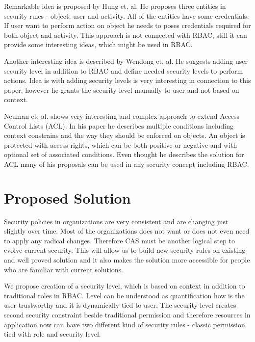 \documentclass{sig-alternate}
\begin{document}
Remarkable idea is proposed by Hung et. al. \cite{hung} He proposes three entities in security rules - object, user and activity. All of the entities have some credentials. If user want to perform action on object he needs to poses credentials required for both object and activity. This approach is not connected with RBAC, still it can provide some interesting ideas, which might be used in RBAC.

Another interesting idea is described by Wendong et. al. \cite{wendong} He suggests adding user security level in addition to RBAC and define needed security levels to perform actions. Idea is with adding security levels is very interesting in connection to this paper, however he grants the security level manually to user and not based on context.

Neuman et. al. \cite{eacl} shows very interesting and complex approach to extend Access Control Lists (ACL). In his paper he describes multiple conditions including context constrains and the way they should be enforced on objects. An object is protected with access rights, which can be both positive or negative and with optional set of associated conditions. Even thought he describes the solution for ACL many of his proposals can be used in any security concept including RBAC.

\section{Proposed Solution}
Security policies in organizations are very consistent and are changing just slightly over time. Most of the organizations does not want or does not even need to apply any radical changes. Therefore CAS must be another logical step to evolve current security. This will allow us to build new security rules on existing and well proved solution and it also makes the solution more accessible for people who are familiar with current solutions.

We propose creation of a security level, which is based on context in addition to traditional roles in RBAC. Level can be understood as quantification how is the user trustworthy and it is dynamically tied to user. The security level creates second security constraint beside traditional permission and therefore resources in application now can have two different kind of security rules - classic permission tied with role and security level.

\end{document}
